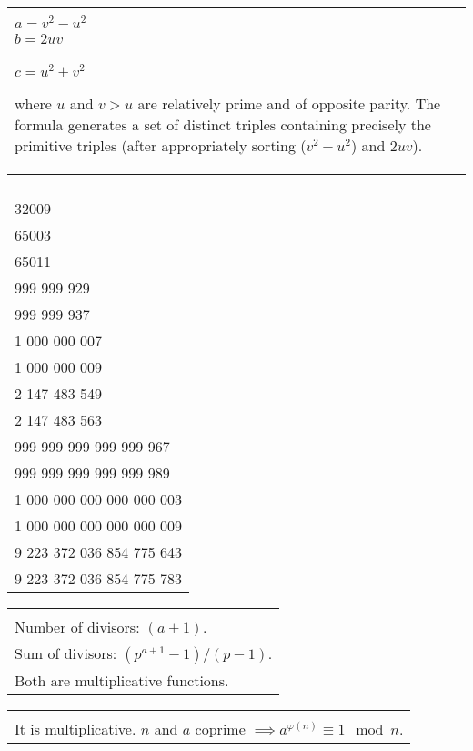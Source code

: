 \documentclass[10pt,a4paper,twocolumn]{article}
\newenvironment{fpar}
	{
		\nopagebreak
		\begin{tabular}{|l|}
		\hline\begin{minipage}{277pt}
		\vspace{0.5em}
	}
	{
		\vspace{0.5em}
		\end{minipage}\\
		\hline\end{tabular}
		\nopagebreak
	}
\begin{document}
\begin{fpar}
{\bf Pythagorean Triplets}

$$a^2 + b^2 = c^2$$
\emph{Euclid's generating formula}:\\
$a = v^2 - u^2$\\
$b = 2uv$\\
$c = u^2 + v^2$

where $u$ and $v > u$ are relatively prime and of opposite parity.
The formula generates a set of distinct triples containing precisely the
primitive triples (after appropriately sorting ($v^2-u^2$) and $2uv$).
\end{fpar}

\begin{fpar}
{\bf Primes}

32003\\
32009\\
65003\\
65011\\

999 999 929\\
999 999 937\\
1 000 000 007\\
1 000 000 009\\

2 147 483 549\\
2 147 483 563\\

999 999 999 999 999 967\\
999 999 999 999 999 989\\
1 000 000 000 000 000 003\\
1 000 000 000 000 000 009\\

9 223 372 036 854 775 643\\
9 223 372 036 854 775 783
\end{fpar}

\begin{fpar}
{\bf Divisors}

Let $n = p^a$, where $p$ is a prime.\\
Number of divisors: $(a+1)$.\\
Sum of divisors: $(p^{a+1} - 1) / (p-1)$.\\
Both are multiplicative functions.
\end{fpar}

\begin{fpar}
{\bf Euler's totient function}

$\varphi(n)$ the number of positive integers less than or equal to $n$ that are
coprime to $n$.
$$\sum_{d|n} \varphi(d) = n$$
$$\varphi(p^k) = (p-1) p^{k-1}$$
Examples: $\varphi(9) = 6$, $\varphi(36) = 12$\\
It is multiplicative.
$n$ and $a$ coprime $\implies a^{\varphi(n)}\equiv 1 \mod n$.
\end{fpar}
\end{document}
